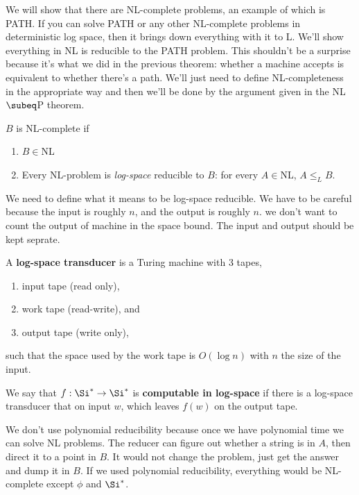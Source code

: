 We will show that there are NL-complete problems, an example of which is PATH. If you can solve PATH or any other NL-complete problems in deterministic log space, then it brings down everything with it to L. We'll show everything in NL is reducible to the PATH problem. This shouldn't be a surprise because it's what we did in the previous theorem: whether a machine accepts is equivalent to whether there's a path. We'll just need to define NL-completeness in the appropriate way and then we'll be done by the argument given in the NL$\subeq$P theorem.
\begin{df}
$B$ is NL-complete if
\begin{enumerate}
\item
$B\in$NL
\item
Every NL-problem is {\it log-space} reducible to $B$: for every $A\in$NL, $A\le_LB$.
\end{enumerate}
\end{df}
We need to define what it means to be log-space reducible. We have to be careful because the input is roughly $n$, and the output is roughly $n$. we don't want to count the output of machine in the space bound. The input and output should be kept seprate.
\begin{df}
A \textbf{log-space transducer} is a Turing machine with 3 tapes,
\begin{enumerate}
\item
input tape (read only),
\item work tape (read-write), and
\item
 output tape (write only),
\end{enumerate}
such that the space used by the work tape is $O(\log n)$ with $n$ the size of the input.

We say that $f:\Si^*\to \Si^*$ is \textbf{computable in log-space} if there is a log-space transducer that on input $w$, which leaves $f(w)$ on the output tape. 
\end{df}


We don't use polynomial reducibility because once we have polynomial time we can solve NL problems. The reducer can figure out whether a string is in $A$, then direct it to a point in $B$. It would not change the problem, just get the answer and dump it in $B$. If we used polynomial reducibility, everything would be NL-complete except $\phi$ and $\Si^*$.

